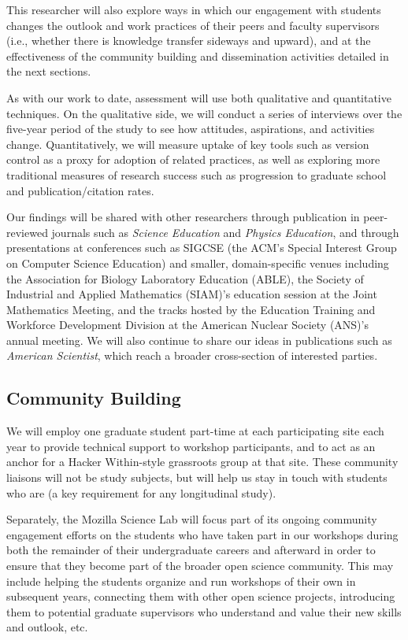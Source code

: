 \documentclass[11pt]{article}
\begin{document}
This researcher will also explore ways in which our engagement with
students changes the outlook and work practices of their peers and
faculty supervisors (i.e., whether there is knowledge transfer
sideways and upward), and at the effectiveness of the community
building and dissemination activities detailed in the next sections.

As with our work to date, assessment will use both qualitative and
quantitative techniques.  On the qualitative side, we will conduct a
series of interviews over the five-year period of the study to see how
attitudes, aspirations, and activities change.  Quantitatively, we
will measure uptake of key tools such as version control as a proxy
for adoption of related practices, as well as exploring more
traditional measures of research success such as progression to
graduate school and publication/citation rates.  

Our findings will be shared with other researchers through publication
in peer-reviewed journals such as \emph{Science Education} and
\emph{Physics Education}, and through presentations at conferences
such as SIGCSE (the ACM's Special Interest Group on Computer Science
Education) and smaller, domain-specific venues including the
Association for Biology Laboratory Education (ABLE), the Society of
Industrial and Applied Mathematics (SIAM)'s education session at the
Joint Mathematics Meeting, and the tracks hosted by the Education
Training and Workforce Development Division at the American Nuclear
Society (ANS)'s annual meeting.  We will also continue to share our
ideas in publications such as \emph{American Scientist}, which reach a
broader cross-section of interested parties.

\subsection{Community Building}

We will employ one graduate student part-time at each participating
site each year to provide technical support to workshop participants,
and to act as an anchor for a Hacker Within-style grassroots group at
that site.  These community liaisons will not be study subjects, but
will help us stay in touch with students who are (a key requirement
for any longitudinal study).

Separately, the Mozilla Science Lab will focus part of its ongoing
community engagement efforts on the students who have taken part in
our workshops during both the remainder of their undergraduate careers
and afterward in order to ensure that they become part of the broader
open science community.  This may include helping the students
organize and run workshops of their own in subsequent years,
connecting them with other open science projects, introducing them to
potential graduate supervisors who understand and value their new
skills and outlook, etc.
\end{document}

